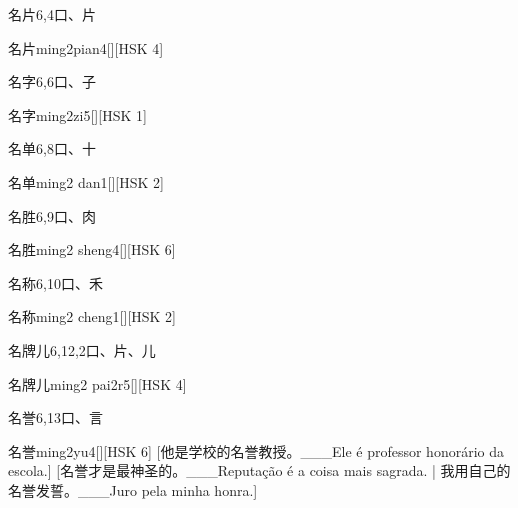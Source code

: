 \begin{entry}{名片}{6,4}{⼝、⽚}
  \begin{phonetics}{名片}{ming2pian4}[][HSK 4]
  \end{phonetics}
\end{entry}

\begin{entry}{名字}{6,6}{⼝、⼦}
  \begin{phonetics}{名字}{ming2zi5}[][HSK 1]
  \end{phonetics}
\end{entry}

\begin{entry}{名单}{6,8}{⼝、⼗}
  \begin{phonetics}{名单}{ming2 dan1}[][HSK 2]
  \end{phonetics}
\end{entry}

\begin{entry}{名胜}{6,9}{⼝、⾁}
  \begin{phonetics}{名胜}{ming2 sheng4}[][HSK 6]
  \end{phonetics}
\end{entry}

\begin{entry}{名称}{6,10}{⼝、⽲}
  \begin{phonetics}{名称}{ming2 cheng1}[][HSK 2]
  \end{phonetics}
\end{entry}

\begin{entry}{名牌儿}{6,12,2}{⼝、⽚、⼉}
  \begin{phonetics}{名牌儿}{ming2 pai2r5}[][HSK 4]
  \end{phonetics}
\end{entry}

\begin{entry}{名誉}{6,13}{⼝、⾔}
  \begin{phonetics}{名誉}{ming2yu4}[][HSK 6]
    [他是学校的名誉教授。___Ele é professor honorário da escola.]
    [名誉才是最神圣的。___Reputação é a coisa mais sagrada. | 我用自己的名誉发誓。___Juro pela minha honra.]
  \end{phonetics}
\end{entry}


